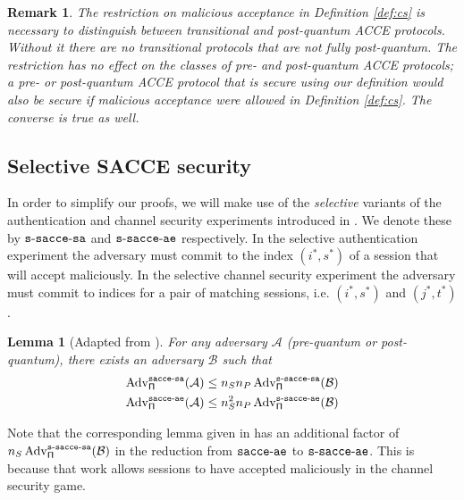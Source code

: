 \documentclass[USenglish,oneside,twocolumn]{article}
\theoremstyle{dgthm}
\newtheorem{lemma}[theorem]{Lemma}
\theoremstyle{dgdef}
\newtheorem{remark}[theorem]{Remark}
\newcommand{\Protocol}[1]{\operatorname{\mathsf{#1}}}
\newcommand{\Oracle}[1]{\mathcal #1}
\newcommand{\Experiment}[1]{\operatorname{\tt{#1}}}
\newcommand{\Algorithm}[1]{\mathcal #1}
\newcommand{\AdvName}[2]{\operatorname{\mathrm{Adv}_{\Protocol{#1}}^{\Experiment{#2}}}}
\newcommand{\Adv}[3]{\AdvName{#1}{#2}(\Algorithm{#3})}
\newcommand{\AcceSa}[2]{\Adv{#1}{sacce-sa}{#2}}
\newcommand{\AcceAe}[2]{\Adv{#1}{sacce-ae}{#2}}
\begin{document}
    \pagebreak
    \begin{remark}
      The restriction on malicious acceptance in Definition \ref{def:cs} is
      necessary to distinguish between transitional and post-quantum ACCE
      protocols.  Without it there are no transitional protocols that are not
      fully post-quantum. The restriction has no effect on the classes of pre-
      and post-quantum ACCE protocols; a pre- or post-quantum ACCE protocol
      that is secure using our definition would also be secure if malicious
      acceptance were allowed in Definition \ref{def:cs}. The converse is true
      as well.
    \end{remark}

    \subsection{Selective SACCE security}
    In order to simplify our proofs, we will make use of the \emph{selective} variants
    of the authentication and channel security experiments introduced in
    \cite{Krawczyk2013}. We denote these by $\Experiment{s-sacce-sa}$ and
    $\Experiment{s-sacce-ae}$ respectively. In the selective authentication
    experiment the adversary must commit to the index $(i^*, s^*)$ of a
    session that will accept maliciously. In the selective channel
    security experiment the adversary must commit to indices for a pair of
    matching sessions, i.e.  $(i^*, s^*)$ and $(j^*, t^*)$.

    \begin{lemma}[Adapted from \cite{Krawczyk2013}]\label{lem:selective}
      For any adversary $\Oracle{A}$ (pre-quantum or post-quantum), there exists an adversary $\Oracle{B}$ such that
      \begin{align*}
        \AcceSa{\Pi}{A} &\le n_Sn_P\Adv{\Pi}{s-sacce-sa}{B}\\
        \AcceAe{\Pi}{A} &\le n_S^2n_P\Adv{\Pi}{s-sacce-ae}{B}\\
      \end{align*}
    \end{lemma}

    Note that the corresponding lemma given in \cite{Krawczyk2013} has an
    additional factor of $n_S\Adv{\Pi}{s-sacce-sa}{B}$ in the reduction from
    $\Experiment{sacce-ae}$ to $\Experiment{s-sacce-ae}$. This is because that work
    allows sessions to have accepted maliciously in the channel security game.
\end{document}
